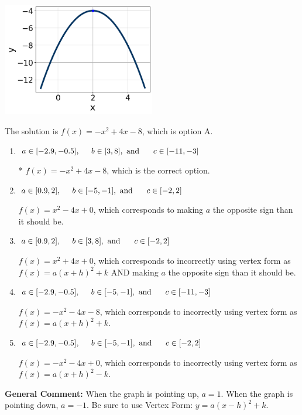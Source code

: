 \documentclass{extbook}[14pt]
\begin{document}
\begin{enumerate}
{\begin{center}
    \includegraphics[width=0.5\textwidth]{../Figures/quadraticGraphToEquationCopyA.png}
\end{center}


The solution is \( f(x) = -x^{2} +4 x -8 \), which is option A.\begin{enumerate}[label=\Alph*.]
\item \( a \in [-2.9, -0.5], \hspace*{5mm} b \in [3, 8], \text{ and } \hspace*{5mm} c \in [-11, -3] \)

* $f(x)=-x^{2} +4 x -8$, which is the correct option.
\item \( a \in [0.9, 2], \hspace*{5mm} b \in [-5, -1], \text{ and } \hspace*{5mm} c \in [-2, 2] \)

$f(x)=x^{2} -4 x + 0$, which corresponds to making $a$ the opposite sign than it should be.
\item \( a \in [0.9, 2], \hspace*{5mm} b \in [3, 8], \text{ and } \hspace*{5mm} c \in [-2, 2] \)

$f(x)=x^{2} +4 x + 0$, which corresponds to incorrectly using vertex form as $f(x) = a(x+h)^2+k$ AND making $a$ the opposite sign than it should be.
\item \( a \in [-2.9, -0.5], \hspace*{5mm} b \in [-5, -1], \text{ and } \hspace*{5mm} c \in [-11, -3] \)

$f(x)=-x^{2} -4 x -8$, which corresponds to incorrectly using vertex form as $f(x) = a(x+h)^2+k$.
\item \( a \in [-2.9, -0.5], \hspace*{5mm} b \in [-5, -1], \text{ and } \hspace*{5mm} c \in [-2, 2] \)

$f(x)=-x^{2} -4 x + 0$, which corresponds to incorrectly using vertex form as $f(x) = a(x+h)^2 - k$.
\end{enumerate}

\textbf{General Comment:} When the graph is pointing up, $a=1$. When the graph is pointing down, $a=-1$. Be sure to use Vertex Form: $y = a(x-h)^2+k$.
}
\end{enumerate}
\end{document}
